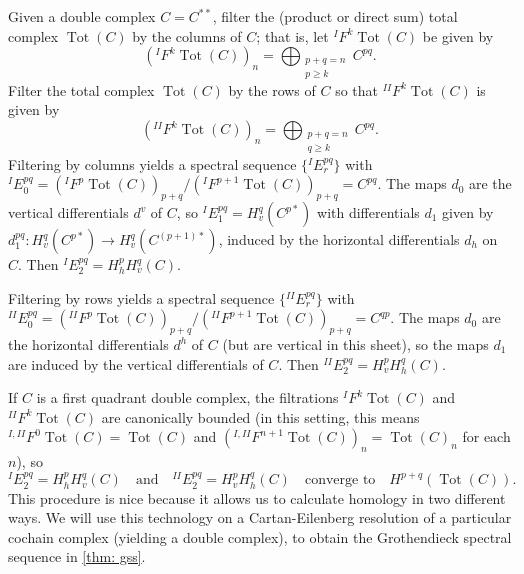 \documentclass[11pt,leqno]{article}
\theoremstyle{plain}
\theoremstyle{definition}
\numberwithin{equation}{section}
\numberwithin{lem}{section}
\DeclareMathOperator{\Tot}{Tot}
\begin{document}
Given a double complex $C = C^{\ast\ast}$, filter the (product or direct sum) total complex $\Tot(C)$ by the columns of $C$; that is, let ${}^I\!F^k\Tot(C)$ be given by
\[({}^I\!F^k\Tot(C))_n = \bigoplus_{\substack{p+q = n\\ p\geq k}} C^{pq}.\] Filter the total complex $\Tot(C)$ by the rows of $C$ so that ${}^{II}\!F^k\Tot(C)$ is given by
\[({}^{II}\!F^k\Tot(C))_n = \bigoplus_{\substack{p+q = n\\ q\geq k}} C^{pq}.\]
Filtering by columns yields a spectral sequence $\{{}^{I}\!E_r^{pq}\}$ with ${}^{I}\!E_0^{pq} = ({}^I\!F^p\Tot(C))_{p+q}/({}^I\!F^{p+1}\Tot(C))_{p+q} = C^{pq}$. The maps $d_0$ are the vertical differentials $d^v$ of $C$, so ${}^{I}\!E_1^{pq} = H_v^q(C^{p\ast})$ with differentials $d_1$ given by $d_1^{pq}\colon H_v^q(C^{p\ast})\to H_v^q(C^{(p+1)\ast})$, induced by the horizontal differentials $d_h$ on $C$. Then ${}^{I}\!E_2^{pq} = H_h^pH_v^q(C)$.

Filtering by rows yields a spectral sequence $\{{}^{II}\!E_r^{pq}\}$ with ${}^{II}\!E_0^{pq} = ({}^{II}\!F^p\Tot(C))_{p+q}/({}^{II}\!F^{p+1}\Tot(C))_{p+q} = C^{qp}$. The maps $d_0$ are the horizontal differentials $d^h$ of $C$ (but are vertical in this sheet), so the maps $d_1$ are induced by the vertical differentials of $C$. Then ${}^{II}\!E_2^{pq} = H_v^pH_h^q(C)$.

If $C$ is a first quadrant double complex, the filtrations ${}^I\!F^k\Tot(C)$ and ${}^{II}\!F^k\Tot(C)$ are canonically bounded (in this setting, this means ${}^{I,II}\!F^0\Tot(C) = \Tot(C)$ and $({}^{I,II}\!F^{n+1}\Tot(C))_n = \Tot(C)_n$ for each $n$), so
\[{}^{I}\!E_2^{pq} = H_h^pH_v^q(C) \quad \text{and}\quad {}^{II}\!E_2^{pq} = H_v^pH_h^q(C) \quad\text{converge to}\quad H^{p+q}(\Tot(C)).\]
This procedure is nice because it allows us to calculate homology in two different ways. We will use this technology on a Cartan-Eilenberg resolution of a particular cochain complex (yielding a double complex), to obtain the Grothendieck spectral sequence in \cref{thm: gss}.
\end{document}
